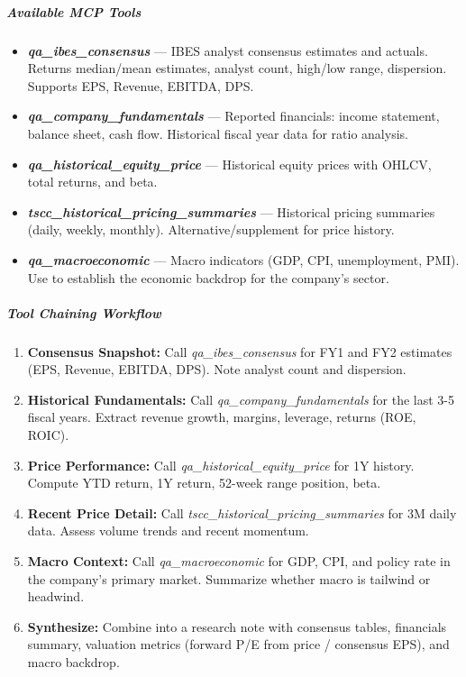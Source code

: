 \documentclass[11pt]{article}
\begin{document}
\subparagraph{Available MCP Tools}\mbox{}\par

\begin{itemize}[leftmargin=*,itemsep=2pt,topsep=2pt]
\item {} \textbf{\emph{qa\_\allowbreak{}ibes\_\allowbreak{}consensus}} — IBES analyst consensus estimates and actuals. Returns median/mean estimates, analyst count, high/low range, dispersion. Supports EPS, Revenue, EBITDA, DPS.
\item {} \textbf{\emph{qa\_\allowbreak{}company\_\allowbreak{}fundamentals}} — Reported financials: income statement, balance sheet, cash flow. Historical fiscal year data for ratio analysis.
\item {} \textbf{\emph{qa\_\allowbreak{}historical\_\allowbreak{}equity\_\allowbreak{}price}} — Historical equity prices with OHLCV, total returns, and beta.
\item {} \textbf{\emph{tscc\_\allowbreak{}historical\_\allowbreak{}pricing\_\allowbreak{}summaries}} — Historical pricing summaries (daily, weekly, monthly). Alternative/supplement for price history.
\item {} \textbf{\emph{qa\_\allowbreak{}macroeconomic}} — Macro indicators (GDP, CPI, unemployment, PMI). Use to establish the economic backdrop for the company's sector.
\end{itemize}

\subparagraph{Tool Chaining Workflow}\mbox{}\par

\begin{enumerate}[leftmargin=*,itemsep=2pt,topsep=2pt]
\item {} \textbf{Consensus Snapshot:} Call \emph{qa\_\allowbreak{}ibes\_\allowbreak{}consensus} for FY1 and FY2 estimates (EPS, Revenue, EBITDA, DPS). Note analyst count and dispersion.
\item {} \textbf{Historical Fundamentals:} Call \emph{qa\_\allowbreak{}company\_\allowbreak{}fundamentals} for the last 3-5 fiscal years. Extract revenue growth, margins, leverage, returns (ROE, ROIC).
\item {} \textbf{Price Performance:} Call \emph{qa\_\allowbreak{}historical\_\allowbreak{}equity\_\allowbreak{}price} for 1Y history. Compute YTD return, 1Y return, 52-week range position, beta.
\item {} \textbf{Recent Price Detail:} Call \emph{tscc\_\allowbreak{}historical\_\allowbreak{}pricing\_\allowbreak{}summaries} for 3M daily data. Assess volume trends and recent momentum.
\item {} \textbf{Macro Context:} Call \emph{qa\_\allowbreak{}macroeconomic} for GDP, CPI, and policy rate in the company's primary market. Summarize whether macro is tailwind or headwind.
\item {} \textbf{Synthesize:} Combine into a research note with consensus tables, financials summary, valuation metrics (forward P/E from price / consensus EPS), and macro backdrop.
\end{enumerate}
\end{document}

